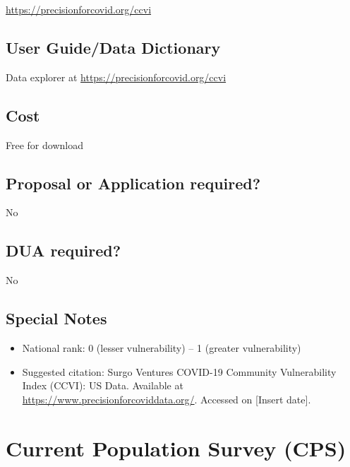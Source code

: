 \documentclass[
]{book}
\providecommand{\tightlist}{%
  \setlength{\itemsep}{0pt}\setlength{\parskip}{0pt}}
\begin{document}
\url{https://precisionforcovid.org/ccvi}

\hypertarget{user-guidedata-dictionary-20}{%
\section{User Guide/Data Dictionary}\label{user-guidedata-dictionary-20}}

Data explorer at \url{https://precisionforcovid.org/ccvi}

\hypertarget{cost-20}{%
\section{Cost}\label{cost-20}}

Free for download

\hypertarget{proposal-or-application-required-20}{%
\section{Proposal or Application required?}\label{proposal-or-application-required-20}}

No

\hypertarget{dua-required-20}{%
\section{DUA required?}\label{dua-required-20}}

No

\hypertarget{special-notes-20}{%
\section{Special Notes}\label{special-notes-20}}

\begin{itemize}
\tightlist
\item
  National rank: 0 (lesser vulnerability) -- 1 (greater vulnerability)
\item
  Suggested citation: Surgo Ventures COVID-19 Community Vulnerability Index (CCVI): US Data. Available at \url{https://www.precisionforcoviddata.org/}. Accessed on {[}Insert date{]}.
\end{itemize}

\mainmatter

\hypertarget{current-population-survey-cps}{%
\chapter{Current Population Survey (CPS)}\label{current-population-survey-cps}}
\end{document}
